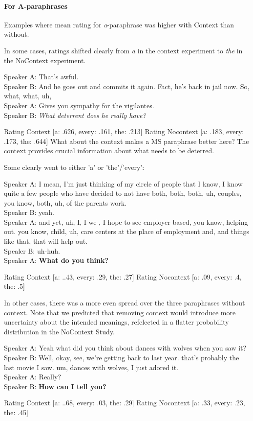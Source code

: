 \documentclass[12pt,letterpaper,table,svgnames,dvipsnames]{article}
\begin{document}
\paragraph{For A-paraphrases} Examples where mean rating for \emph{a}-paraphrase was higher with Context than without.

In some cases, ratings shifted clearly from \emph{a} in the context experiment to \emph{the} in the NoContext experiment.
\begin{exe}
\ex {}
Speaker A: That's awful.\\
Speaker B: And he goes out and commits it again. Fact, he's back in jail now. So, what, what, uh,\\
Speaker A: Gives you sympathy for the vigilantes.\\
Speaker B: \emph{What deterrent does he really have?} \\
\end{exe}
Rating Context [a: .626, every: .161, the: .213]
Rating Nocontext [a: .183, every: .173, the: .644]
What about the context makes a MS paraphrase better here? The context provides crucial information about what needs to be deterred. 


Some clearly went to either 'a' or 'the'/'every':
\begin{exe}
    \ex {}
    Speaker A: I mean, I'm just thinking of my circle of people that I know, I know quite a few people who have decided to not have both, both, both, uh, couples, you know, both, uh, of the parents work.\\
    Speaker B: yeah.\\
    Speaker A: and yet, uh, I, I we-, I hope to see employer based, you know, helping out. you know, child, uh, care centers at the place of employment and, and things like that, that will help out.\\
    Spealer B: uh-huh.\\
    Speaker A: \textbf{What do you think?}
\end{exe}

Rating Context [a: ..43, every: .29, the: .27]
Rating Nocontext [a: .09, every: .4, the: .5]





In other cases, there was a more even spread over the three paraphrases without context. Note that we predicted that removing context would introduce more uncertainty about the intended meanings, refelected in a flatter probability distribution in the NoContext Study. 
\begin{exe}
    \ex {}
    Speaker A: Yeah what did you think about dances with wolves when you saw it?\\
    Speaker B: Well, okay, see, we're getting back to last year. that's probably the last movie I saw. um, dances with wolves, I just adored it.\\
    Speaker A: Really?\\
    Speaker B: \textbf{How can I tell you?}
\end{exe}
Rating Context [a: ..68, every: .03, the: .29]
Rating Nocontext [a: .33, every: .23, the: .45]
\end{document}
